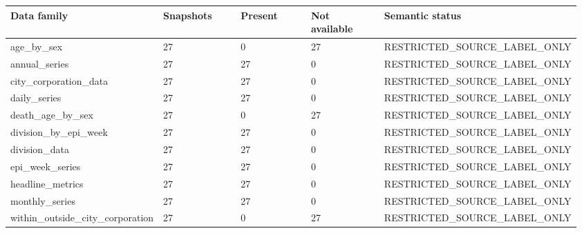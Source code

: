 \begingroup\footnotesize\setlength{\tabcolsep}{3pt}\renewcommand{\arraystretch}{1.15}
\begin{longtable}{P{0.1920\linewidth}P{0.1920\linewidth}P{0.1920\linewidth}P{0.1920\linewidth}P{0.1920\linewidth}}
\toprule
Data family & Snapshots & Present & Not available & Semantic status \\
\midrule\endhead
age\_by\_sex & 27 & 0 & 27 & RESTRICTED\_SOURCE\_LABEL\_ONLY \\
annual\_series & 27 & 27 & 0 & RESTRICTED\_SOURCE\_LABEL\_ONLY \\
city\_corporation\_data & 27 & 27 & 0 & RESTRICTED\_SOURCE\_LABEL\_ONLY \\
daily\_series & 27 & 27 & 0 & RESTRICTED\_SOURCE\_LABEL\_ONLY \\
death\_age\_by\_sex & 27 & 0 & 27 & RESTRICTED\_SOURCE\_LABEL\_ONLY \\
division\_by\_epi\_week & 27 & 27 & 0 & RESTRICTED\_SOURCE\_LABEL\_ONLY \\
division\_data & 27 & 27 & 0 & RESTRICTED\_SOURCE\_LABEL\_ONLY \\
epi\_week\_series & 27 & 27 & 0 & RESTRICTED\_SOURCE\_LABEL\_ONLY \\
headline\_metrics & 27 & 27 & 0 & RESTRICTED\_SOURCE\_LABEL\_ONLY \\
monthly\_series & 27 & 27 & 0 & RESTRICTED\_SOURCE\_LABEL\_ONLY \\
within\_outside\_city\_corporation & 27 & 0 & 27 & RESTRICTED\_SOURCE\_LABEL\_ONLY \\
\bottomrule
\end{longtable}
\endgroup

